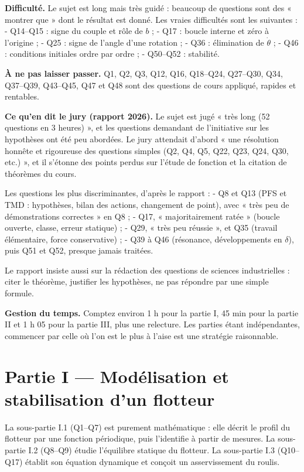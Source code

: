 \documentclass[11pt,a4paper]{article}
\begin{document}
\textbf{Difficulté.} Le sujet est long mais très guidé : beaucoup de questions sont des « montrer que » dont le résultat est donné. Les vraies difficultés sont les suivantes :
- Q14--Q15 : signe du couple et rôle de \(b\) ;
- Q17 : boucle interne et zéro à l'origine ;
- Q25 : signe de l'angle d'une rotation ;
- Q36 : élimination de \(\dot\theta\) ;
- Q46 : conditions initiales ordre par ordre ;
- Q50--Q52 : stabilité.

\textbf{À ne pas laisser passer.} Q1, Q2, Q3, Q12, Q16, Q18--Q24, Q27--Q30, Q34, Q37--Q39, Q43--Q45, Q47 et Q48 sont des questions de cours appliqué, rapides et rentables.

\textbf{Ce qu'en dit le jury (rapport 2026).} Le sujet est jugé « très long (52 questions en 3 heures) », et les questions demandant de l'initiative sur les hypothèses ont été peu abordées. Le jury attendait d'abord « une résolution honnête et rigoureuse des questions simples (Q2, Q4, Q5, Q22, Q23, Q24, Q30, etc.) », et il s'étonne des points perdus sur l'étude de fonction et la citation de théorèmes du cours.

Les questions les plus discriminantes, d'après le rapport :
- Q8 et Q13 (PFS et TMD : hypothèses, bilan des actions, changement de point), avec « très peu de démonstrations correctes » en Q8 ;
- Q17, « majoritairement ratée » (boucle ouverte, classe, erreur statique) ;
- Q29, « très peu réussie », et Q35 (travail élémentaire, force conservative) ;
- Q39 à Q46 (résonance, développements en \(\delta\)), puis Q51 et Q52, presque jamais traitées.

Le rapport insiste aussi sur la rédaction des questions de sciences industrielles : citer le théorème, justifier les hypothèses, ne pas répondre par une simple formule.

\textbf{Gestion du temps.} Comptez environ 1 h pour la partie I, 45 min pour la partie II et 1 h 05 pour la partie III, plus une relecture. Les parties étant indépendantes, commencer par celle où l'on est le plus à l'aise est une stratégie raisonnable.

\hypertarget{partie-i-moduxe9lisation-et-stabilisation-dun-flotteur}{%
\section{Partie I --- Modélisation et stabilisation d'un flotteur}\label{partie-i-moduxe9lisation-et-stabilisation-dun-flotteur}}

La sous-partie I.1 (Q1--Q7) est purement mathématique : elle décrit le profil du flotteur par une fonction périodique, puis l'identifie à partir de mesures. La sous-partie I.2 (Q8--Q9) étudie l'équilibre statique du flotteur. La sous-partie I.3 (Q10--Q17) établit son équation dynamique et conçoit un asservissement du roulis.
\end{document}
